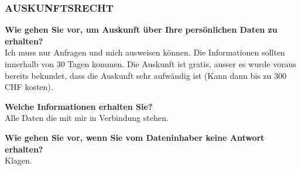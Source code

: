 \hypertarget{auskunftsrecht-1}{%
\subsubsection{AUSKUNFTSRECHT}\label{auskunftsrecht-1}}

\textbf{Wie gehen Sie vor, um Auskunft über Ihre persönlichen Daten zu
erhalten?}\\
Ich muss nur Anfragen und mich ausweisen können. Die Informationen
sollten innerhalb von 30 Tagen kommen. Die Auskunft ist gratis, ausser
es wurde voraus bereits bekundet, dass die Auskunft sehr aufwändig ist
(Kann dann bis zu 300 CHF kosten).

\textbf{Welche Informationen erhalten Sie?}\\
Alle Daten die mit mir in Verbindung stehen.

\textbf{Wie gehen Sie vor, wenn Sie vom Dateninhaber keine Antwort
erhalten?}\\
Klagen.
